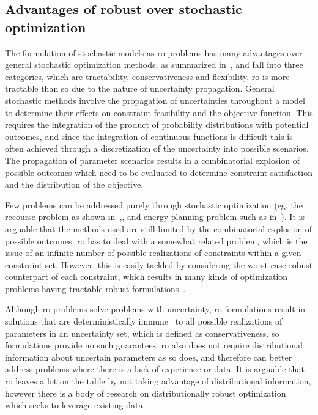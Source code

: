 \subsection{Advantages of robust over stochastic optimization}

The formulation of stochastic models as \gls{ro} problems has many advantages
over general stochastic optimization methods, as summarized in~\cite{Bertsimas2011},
and fall into three categories, which are tractability, conservativeness and flexibility.
\gls{ro} is more tractable than \gls{so} due to the nature of uncertainty propagation.
General stochastic methods involve the propagation of uncertainties throughout a model
to determine their effects on constraint feasibility and the objective function.
This requires the integration of the product of probability distributions with potential outcomes,
and since the integration of continuous functions is difficult this is often achieved through
a discretization of the uncertainty into possible scenarios. The propagation of parameter
scenarios results in a combinatorial explosion of possible outcomes which need to be evaluated to determine constraint
satisfaction and the distribution of the objective.

Few problems can be addressed purely through stochastic optimization (eg. the recourse problem as
shown in~\cite{Kall1982},\cite{Higle1991}, and energy planning problem such as in~\cite{Pereira1991}).
It is arguable that the methods used are still limited by the combinatorial
explosion of possible outcomes. \gls{ro} has to deal with a somewhat related problem, which is the issue of an infinite number
of possible realizations of constraints within a given constraint set. However, this is easily
tackled by considering the worst case robust counterpart of each constraint, which
results in many kinds of optimization problems having tractable robust formulations~\cite{Bertsimas2011}.

Although \gls{ro} problems solve problems with uncertainty,
\gls{ro} formulations result in solutions that are deterministically immune~\cite{Bertsimas2011}
to all possible realizations of parameters in an uncertainty set, which is defined as conservativeness.
\gls{so} formulations
provide no such guarantees. \gls{ro} also does not require distributional information
about uncertain parameters as \gls{so} does, and therefore can better address problems where there
is a lack of experience or data. It is arguable that \gls{ro}
leaves a lot on the table by not taking advantage of distributional information,
however there is a body of research on distributionally robust optimization~\cite{Bertsimas2013}
which seeks to leverage existing data.

